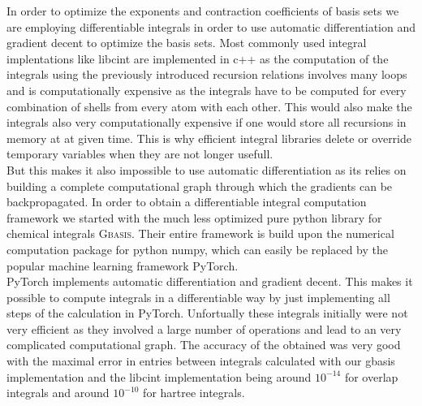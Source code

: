 In order to optimize the exponents and contraction coefficients of basis sets we are employing
differentiable integrals in order to use automatic differentiation and gradient decent to optimize the basis sets. Most commonly used integral implentations like libcint\cite{sun_libcint_2015} are implemented in c++ as the computation of the integrals using the previously introduced recursion relations involves many loops and is computationally expensive as the integrals have to be computed for every combination of shells from every atom with each other. This would also make the integrals also very computationally expensive if one would store all recursions in memory at at given time. This is why efficient integral libraries delete or override temporary variables when they are not longer usefull.\\
But this makes it also impossible to use automatic differentiation as its relies on building a complete computational graph through which the gradients can be backpropagated. In order to obtain a differentiable integral computation framework we started with the much less optimized pure python library for chemical integrals \textsc{Gbasis}\cite{kim_gbasis_2024}. Their entire framework is build upon the numerical computation package for python numpy\cite{harris2020array}, which can easily be replaced by the popular machine learning framework PyTorch\cite{paszke2019pytorch}.\\ PyTorch implements automatic differentiation and gradient decent. This makes it possible to compute integrals in a differentiable way by just implementing all steps of the calculation in PyTorch. Unfortually these integrals initially were not very efficient as they involved a large number of operations and lead to an very complicated computational graph. The accuracy of the obtained was very good with the maximal error in entries between integrals calculated with our gbasis implementation and the libcint implementation being around $10^{-14}$ for overlap integrals and around $10^{-10}$ for hartree integrals.
